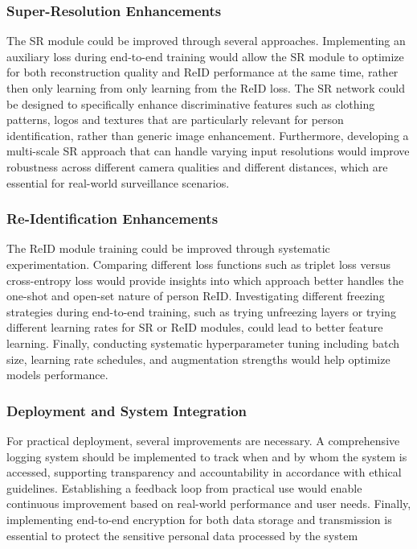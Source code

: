 \subsubsection{Super-Resolution Enhancements}
The \acs{SR} module could be improved through several approaches. Implementing an auxiliary loss during end-to-end training would allow the \acs{SR} module to optimize for both reconstruction quality and \acs{ReID} performance at the same time, rather then only learning from only learning from the \acs{ReID} loss. The \acs{SR} network could be designed to specifically  enhance discriminative features such as clothing patterns, logos and textures that are particularly relevant for person identification, rather than generic image enhancement. Furthermore, developing a multi-scale \acs{SR} approach that can handle varying input resolutions would improve robustness across different camera qualities and different distances, which are essential for real-world surveillance scenarios. 

\subsubsection{Re-Identification Enhancements}
The \acs{ReID} module training could be improved through systematic experimentation. Comparing different loss functions such as triplet loss versus cross-entropy loss would provide insights into which approach better handles the one-shot and open-set nature of person \acs{ReID}. Investigating different freezing strategies during end-to-end training, such as trying unfreezing layers or trying different learning rates for \acs{SR} or \acs{ReID} modules, could lead to better feature learning. Finally, conducting systematic hyperparameter tuning including batch size, learning rate schedules, and augmentation strengths would help optimize models performance.




\subsubsection{Deployment and System Integration}
For practical deployment, several improvements are necessary. A comprehensive logging system should be implemented to track when and by whom the system is accessed, supporting transparency and accountability in accordance with ethical guidelines. Establishing a feedback loop from practical use would enable continuous improvement based on real-world performance and user needs. Finally, implementing end-to-end encryption for both data storage and transmission is essential to protect the sensitive personal data processed by the system 

